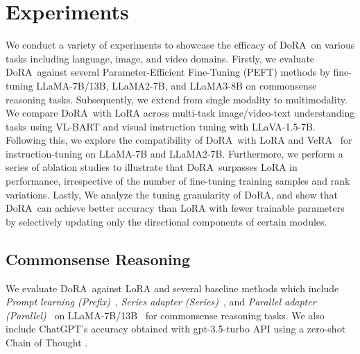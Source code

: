 \documentclass{article}
\newcommand{\ours}{DoRA}
\theoremstyle{plain}
\theoremstyle{definition}
\theoremstyle{remark}
\begin{document}
\section{Experiments}
We conduct a variety of experiments to showcase the efficacy of \ours~on various tasks including language, image, and video domains. Firstly, we evaluate \ours~against several Parameter-Efficient Fine-Tuning (PEFT) methods by fine-tuning LLaMA-7B/13B, LLaMA2-7B, and LLaMA3-8B on commonsense reasoning tasks. Subsequently, we extend from single modality to multimodality. We compare \ours~with LoRA across multi-task image/video-text understanding tasks using VL-BART and visual instruction tuning with LLaVA-1.5-7B. Following this, we explore the compatibility of \ours~with LoRA and VeRA~\cite{kopiczko2023vera} for instruction-tuning on LLaMA-7B and LLaMA2-7B. Furthermore, we perform a series of ablation studies to illustrate that \ours~surpasses LoRA in performance, irrespective of the number of fine-tuning training samples and rank variations.  Lastly, We analyze the tuning granularity of \ours, and show that \ours~can achieve better accuracy than LoRA with fewer trainable parameters by selectively updating only the directional components of certain modules. 

\subsection{Commonsense Reasoning}
\label{sec:llama_commonsense}

We evaluate \ours~against LoRA and several baseline methods which include \textit{Prompt learning (Prefix)}~\cite{li2021prefixtuning}, \textit{Series adapter (Series)}~\cite{houlsby2019series}, and \textit{Parallel adapter (Parallel)}~\cite{he2022parallel}
on LLaMA-7B/13B~\cite{touvron2023llama} for commonsense reasoning tasks. We also include ChatGPT’s accuracy obtained with gpt-3.5-turbo API using a zero-shot Chain of Thought \cite{chatgptdoc, wei2023chainofthought}.
\end{document}
